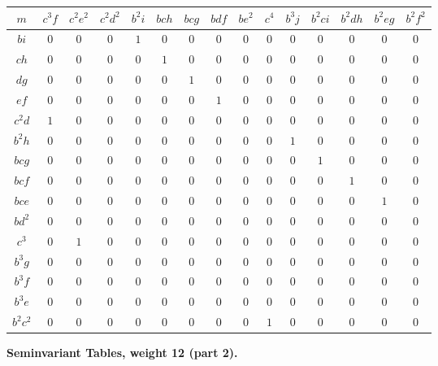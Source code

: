 \documentclass[12pt,a4paper]{article}
\begin{document}
\begin{longtable}{|c|c|c|c|c|c|c|c|c|c|c|c|c|c|c|}
\hline
$m$ & $c^3f$ & $c^2e^2$ & $c^2d^2$ & $b^2i$ & $bch$ & $bcg$ & $bdf$ & $be^2$ & $c^4$ & $b^3j$ & $b^2ci$ & $b^2dh$ & $b^2eg$ & $b^2f^2$\\
\hline
\endhead
$bi$ & $0$ & $0$ & $0$ & $1$ & $0$ & $0$ & $0$ & $0$ & $0$ & $0$ & $0$ & $0$ & $0$ & $0$\\
$ch$ & $0$ & $0$ & $0$ & $0$ & $1$ & $0$ & $0$ & $0$ & $0$ & $0$ & $0$ & $0$ & $0$ & $0$\\
$dg$ & $0$ & $0$ & $0$ & $0$ & $0$ & $1$ & $0$ & $0$ & $0$ & $0$ & $0$ & $0$ & $0$ & $0$\\
$ef$ & $0$ & $0$ & $0$ & $0$ & $0$ & $0$ & $1$ & $0$ & $0$ & $0$ & $0$ & $0$ & $0$ & $0$\\
$c^2d$ & $1$ & $0$ & $0$ & $0$ & $0$ & $0$ & $0$ & $0$ & $0$ & $0$ & $0$ & $0$ & $0$ & $0$\\
$b^2h$ & $0$ & $0$ & $0$ & $0$ & $0$ & $0$ & $0$ & $0$ & $0$ & $1$ & $0$ & $0$ & $0$ & $0$\\
$bcg$ & $0$ & $0$ & $0$ & $0$ & $0$ & $0$ & $0$ & $0$ & $0$ & $0$ & $1$ & $0$ & $0$ & $0$\\
$bcf$ & $0$ & $0$ & $0$ & $0$ & $0$ & $0$ & $0$ & $0$ & $0$ & $0$ & $0$ & $1$ & $0$ & $0$\\
$bce$ & $0$ & $0$ & $0$ & $0$ & $0$ & $0$ & $0$ & $0$ & $0$ & $0$ & $0$ & $0$ & $1$ & $0$\\
$bd^2$ & $0$ & $0$ & $0$ & $0$ & $0$ & $0$ & $0$ & $0$ & $0$ & $0$ & $0$ & $0$ & $0$ & $0$\\
$c^3$ & $0$ & $1$ & $0$ & $0$ & $0$ & $0$ & $0$ & $0$ & $0$ & $0$ & $0$ & $0$ & $0$ & $0$\\
$b^3g$ & $0$ & $0$ & $0$ & $0$ & $0$ & $0$ & $0$ & $0$ & $0$ & $0$ & $0$ & $0$ & $0$ & $0$\\
$b^3f$ & $0$ & $0$ & $0$ & $0$ & $0$ & $0$ & $0$ & $0$ & $0$ & $0$ & $0$ & $0$ & $0$ & $0$\\
$b^3e$ & $0$ & $0$ & $0$ & $0$ & $0$ & $0$ & $0$ & $0$ & $0$ & $0$ & $0$ & $0$ & $0$ & $0$\\
$b^2c^2$ & $0$ & $0$ & $0$ & $0$ & $0$ & $0$ & $0$ & $0$ & $1$ & $0$ & $0$ & $0$ & $0$ & $0$\\
\hline
\end{longtable}

\newpage
\textbf{Seminvariant Tables, weight 12 (part 2).}
\end{document}
